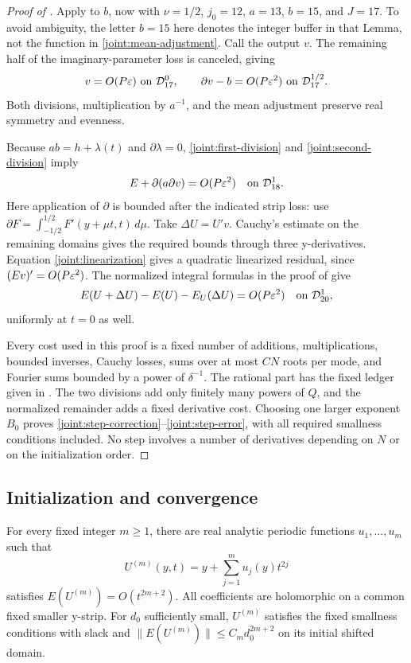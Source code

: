 \begin{proof}[Proof of ]
Apply  to \(b\), now with
\(\nu=1/2\), \(j_0=12\), \(a=13\), \(b=15\), and \(J=17\).
To avoid ambiguity, the letter \(b=15\) here denotes the integer buffer
in that Lemma, not the function in \eqref{joint:mean-adjustment}.
Call the output \(v\). The remaining half of the imaginary-parameter
loss is canceled, giving
\begin{equation}
 v=O(P\varepsilon)\ \hbox{on }\mathcal D_{17}^{0},\qquad
 \partial v-b=O(P\varepsilon^2)\ \hbox{on }\mathcal D_{17}^{1/2}.
 \label{joint:second-division}
\end{equation}
Both divisions, multiplication by \(a^{-1}\), and the mean adjustment
preserve real symmetry and evenness.

Because \(ab=h+\lambda(t)\) and \(\partial\lambda=0\),
\eqref{joint:first-division} and \eqref{joint:second-division} imply
\[
 E+\partial(a\partial v)=O(P\varepsilon^2)
       \quad\hbox{on }\mathcal D_{18}^{1}.
\]
Here application of \(\partial\) is bounded after the indicated strip
loss: use
\(\partial F=\int_{-1/2}^{1/2}F'(y+\mu t,t)\,d\mu\).
Take \(\Delta U=U'v\). Cauchy's estimate on the remaining domains gives
the required bounds through three y-derivatives. Equation
\eqref{joint:linearization} gives a quadratic linearized residual,
since \((Ev)'=O(P\varepsilon^2)\). The normalized integral formulas in the
proof of  give
\[
 E(U+\Delta U)-E(U)-E_U(\Delta U)=O(P\varepsilon^2)
       \quad\hbox{on }\mathcal D_{20}^{1},
\]
uniformly at \(t=0\) as well.

Every cost used in this proof is a fixed number of additions,
multiplications, bounded inverses, Cauchy losses, sums over at most
\(CN\) roots per mode, and Fourier sums bounded by a power of
\(\delta^{-1}\). The rational part has the fixed ledger given in
. The two divisions add only finitely many
powers of \(Q\), and the normalized remainder adds a fixed derivative
cost. Choosing one larger exponent \(B_0\) proves
\eqref{joint:step-correction}--\eqref{joint:step-error}, with all required
smallness conditions included. No step involves a number of derivatives
depending on \(N\) or on the initialization order.
\end{proof}

\subsection{Initialization and convergence}

\begin{lemma}
\label{joint:formal-initialization}
For every fixed integer \(m\ge1\), there are real analytic periodic
functions \(u_1,\ldots,u_m\) such that
\[
 U^{(m)}(y,t)=y+\sum_{j=1}^m u_j(y)t^{2j}
\]
satisfies \(E(U^{(m)})=O(t^{2m+2})\). All coefficients are holomorphic
on a common fixed smaller y-strip. For \(d_0\) sufficiently small,
\(U^{(m)}\) satisfies the fixed smallness conditions with slack and
\(\|E(U^{(m)})\|\le C_m d_0^{2m+2}\) on its initial shifted domain.
\end{lemma}

